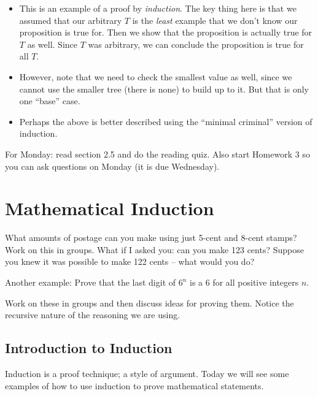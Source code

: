 \documentclass[12pt]{article}
\theoremstyle{plain}
\theoremstyle{definition}
\theoremstyle{remark}
\newcommand{\todayis}[1]{\clearpage{\rhead{\footnotesize #1}}}
\begin{document}
\begin{itemize}
  \item This is an example of a proof by \emph{induction}.  The key thing here is that we assumed that our arbitrary $T$ is the \emph{least} example that we don't know our proposition is true for.  Then we show that the proposition is actually true for $T$ as well.  Since $T$ was arbitrary, we can conclude the proposition is true for all $T$.

  \item However, note that we need to check the smallest value as well, since we cannot use the smaller tree (there is none) to build up to it.  But that is only one ``base'' case.

  \item Perhaps the above is better described using the ``minimal criminal'' version of induction.
\end{itemize}

For Monday: read section 2.5 and do the reading quiz.  Also start Homework 3 so you can ask questions on Monday (it is due Wednesday).




\todayis{Monday, September 10}
\section*{Mathematical Induction}


What amounts of postage can you make using just 5-cent and 8-cent stamps?  Work on this in groups.  What if I asked you: can you make 123 cents?  Suppose you knew it was possible to make 122 cents -- what would you do?

Another example: Prove that the last digit of $6^n$ is a 6 for all positive integers $n$.

Work on these in groups and then discuss ideas for proving them.  Notice the recursive nature of the reasoning we are using.

\subsection*{Introduction to Induction}

Induction is a proof technique; a style of argument.  Today we will see some examples of how to use induction to prove mathematical statements.
\end{document}
